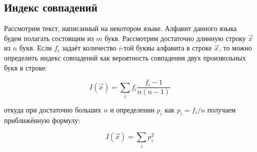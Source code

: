 \subsection{Индекс совпадений}

Рассмотрим текст, написанный на некотором языке. Алфавит данного языка будем полагать состоящим из $m$ букв. Рассмотрим достаточно длинную строку $\vec x$ из $n$ букв. Если $f_i$ задаёт количество $i$-той буквы алфавита в строке $\vec x$, то можно определить индекс совпадений как вероятность совпадения двух произвольных букв в строке:

    $$I \left( \vec x \right) = \sum\limits_i {f_i \frac{{f_i - 1}}{{n\left( {n - 1} \right)}}}$$

откуда при достаточно больших $n$ и определении $p_i$ как $p_i = f_i / n$ получаем приближённую формулу:

    $$I \left( \vec x \right) = \sum\limits_i p_i^2$$ 
